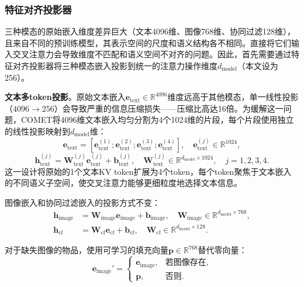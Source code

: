 \subsubsection{特征对齐投影器}

三种模态的原始嵌入维度差异巨大（文本4096维、图像768维、协同过滤128维），且来自不同的预训练模型，其表示空间的尺度和语义结构各不相同。直接将它们输入交叉注意力会导致维度不匹配和语义空间不对齐的问题。因此，首先需要通过特征对齐投影器将三种模态嵌入投影到统一的注意力操作维度$d_{\text{model}}$（本文设为256）。

\textbf{文本多token投影}。原始文本嵌入$\mathbf{e}_{\text{text}} \in \mathbb{R}^{4096}$维度远高于其他模态，单一线性投影（$4096 \to 256$）会导致严重的信息压缩损失——压缩比高达16倍。为缓解这一问题，COMET将4096维文本嵌入均匀分割为4个1024维的片段，每个片段使用独立的线性投影映射到$d_{\text{model}}$维：
\begin{equation}
  \mathbf{e}_{\text{text}} = [\mathbf{e}_{\text{text}}^{(1)}; \mathbf{e}_{\text{text}}^{(2)}; \mathbf{e}_{\text{text}}^{(3)}; \mathbf{e}_{\text{text}}^{(4)}], \quad \mathbf{e}_{\text{text}}^{(j)} \in \mathbb{R}^{1024},
\end{equation}
\begin{equation}
  \mathbf{h}_{\text{text}}^{(j)} = \mathbf{W}_{\text{text}}^{(j)} \mathbf{e}_{\text{text}}^{(j)} + \mathbf{b}_{\text{text}}^{(j)}, \quad \mathbf{W}_{\text{text}}^{(j)} \in \mathbb{R}^{d_{\text{model}} \times 1024}, \quad j = 1, 2, 3, 4.
\end{equation}
这一设计将原始的1个文本KV token扩展为4个token，每个token聚焦于文本嵌入的不同语义子空间，使交叉注意力能够更细粒度地选择文本信息。

图像嵌入和协同过滤嵌入的投影方式不变：
\begin{align}
  \mathbf{h}_{\text{image}} &= \mathbf{W}_{\text{image}} \mathbf{e}_{\text{image}} + \mathbf{b}_{\text{image}}, \quad \mathbf{W}_{\text{image}} \in \mathbb{R}^{d_{\text{model}} \times 768}, \\
  \mathbf{h}_{\text{cf}} &= \mathbf{W}_{\text{cf}} \mathbf{e}_{\text{cf}} + \mathbf{b}_{\text{cf}}, \quad \mathbf{W}_{\text{cf}} \in \mathbb{R}^{d_{\text{model}} \times 128}.
\end{align}

对于缺失图像的物品，使用可学习的填充向量$\mathbf{p} \in \mathbb{R}^{768}$替代零向量：
\begin{equation}
  \mathbf{e}_{\text{image}}' = \begin{cases} \mathbf{e}_{\text{image}}, & \text{若图像存在,} \\ \mathbf{p}, & \text{否则.} \end{cases}
\end{equation}

